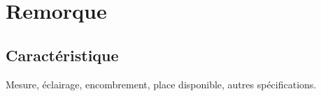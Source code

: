 \section{Remorque}
\subsection{Caractéristique}
Mesure, éclairage, encombrement, place disponible, autres spécifications.
